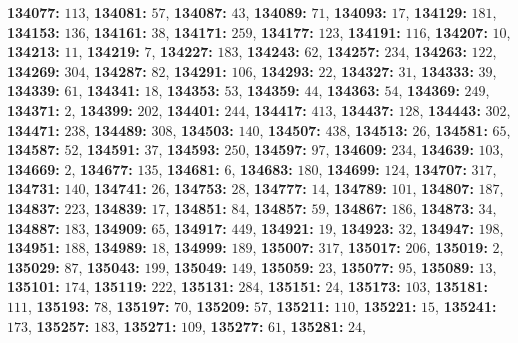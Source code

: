 \textsf{\bfseries 134077:} $113$, \textsf{\bfseries 134081:} $57$, \textsf{\bfseries 134087:} $43$, \textsf{\bfseries 134089:} $71$, \textsf{\bfseries 134093:} $17$, \textsf{\bfseries 134129:} $181$, \textsf{\bfseries 134153:} $136$, \textsf{\bfseries 134161:} $38$, \textsf{\bfseries 134171:} $259$, \textsf{\bfseries 134177:} $123$, \textsf{\bfseries 134191:} $116$, \textsf{\bfseries 134207:} $10$, \textsf{\bfseries 134213:} $11$, \textsf{\bfseries 134219:} $7$, \textsf{\bfseries 134227:} $183$, \textsf{\bfseries 134243:} $62$, \textsf{\bfseries 134257:} $234$, \textsf{\bfseries 134263:} $122$, \textsf{\bfseries 134269:} $304$, \textsf{\bfseries 134287:} $82$, \textsf{\bfseries 134291:} $106$, \textsf{\bfseries 134293:} $22$, \textsf{\bfseries 134327:} $31$, \textsf{\bfseries 134333:} $39$, \textsf{\bfseries 134339:} $61$, \textsf{\bfseries 134341:} $18$, \textsf{\bfseries 134353:} $53$, \textsf{\bfseries 134359:} $44$, \textsf{\bfseries 134363:} $54$, \textsf{\bfseries 134369:} $249$, \textsf{\bfseries 134371:} $2$, \textsf{\bfseries 134399:} $202$, \textsf{\bfseries 134401:} $244$, \textsf{\bfseries 134417:} $413$, \textsf{\bfseries 134437:} $128$, \textsf{\bfseries 134443:} $302$, \textsf{\bfseries 134471:} $238$, \textsf{\bfseries 134489:} $308$, \textsf{\bfseries 134503:} $140$, \textsf{\bfseries 134507:} $438$, \textsf{\bfseries 134513:} $26$, \textsf{\bfseries 134581:} $65$, \textsf{\bfseries 134587:} $52$, \textsf{\bfseries 134591:} $37$, \textsf{\bfseries 134593:} $250$, \textsf{\bfseries 134597:} $97$, \textsf{\bfseries 134609:} $234$, \textsf{\bfseries 134639:} $103$, \textsf{\bfseries 134669:} $2$, \textsf{\bfseries 134677:} $135$, \textsf{\bfseries 134681:} $6$, \textsf{\bfseries 134683:} $180$, \textsf{\bfseries 134699:} $124$, \textsf{\bfseries 134707:} $317$, \textsf{\bfseries 134731:} $140$, \textsf{\bfseries 134741:} $26$, \textsf{\bfseries 134753:} $28$, \textsf{\bfseries 134777:} $14$, \textsf{\bfseries 134789:} $101$, \textsf{\bfseries 134807:} $187$, \textsf{\bfseries 134837:} $223$, \textsf{\bfseries 134839:} $17$, \textsf{\bfseries 134851:} $84$, \textsf{\bfseries 134857:} $59$, \textsf{\bfseries 134867:} $186$, \textsf{\bfseries 134873:} $34$, \textsf{\bfseries 134887:} $183$, \textsf{\bfseries 134909:} $65$, \textsf{\bfseries 134917:} $449$, \textsf{\bfseries 134921:} $19$, \textsf{\bfseries 134923:} $32$, \textsf{\bfseries 134947:} $198$, \textsf{\bfseries 134951:} $188$, \textsf{\bfseries 134989:} $18$, \textsf{\bfseries 134999:} $189$, \textsf{\bfseries 135007:} $317$, \textsf{\bfseries 135017:} $206$, \textsf{\bfseries 135019:} $2$, \textsf{\bfseries 135029:} $87$, \textsf{\bfseries 135043:} $199$, \textsf{\bfseries 135049:} $149$, \textsf{\bfseries 135059:} $23$, \textsf{\bfseries 135077:} $95$, \textsf{\bfseries 135089:} $13$, \textsf{\bfseries 135101:} $174$, \textsf{\bfseries 135119:} $222$, \textsf{\bfseries 135131:} $284$, \textsf{\bfseries 135151:} $24$, \textsf{\bfseries 135173:} $103$, \textsf{\bfseries 135181:} $111$, \textsf{\bfseries 135193:} $78$, \textsf{\bfseries 135197:} $70$, \textsf{\bfseries 135209:} $57$, \textsf{\bfseries 135211:} $110$, \textsf{\bfseries 135221:} $15$, \textsf{\bfseries 135241:} $173$, \textsf{\bfseries 135257:} $183$, \textsf{\bfseries 135271:} $109$, \textsf{\bfseries 135277:} $61$, \textsf{\bfseries 135281:} $24$, 
